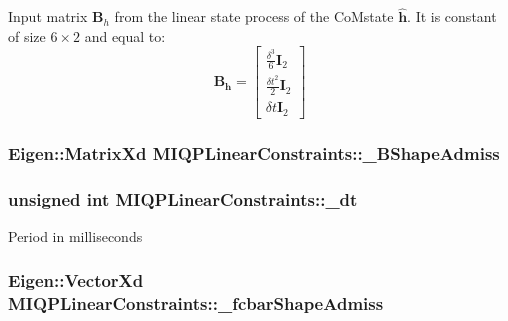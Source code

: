 \-Input matrix $\mathbf{B}_h$ from the linear state process of the \-Co\-Mstate $\hat{\mathbf{h}}$. \-It is constant of size $6\times2$ and equal to\-: \[ \mathbf{B_h} = \left[ \begin{array}{c} \frac{\delta^3}{6}\mathbf{I}_2 \\ \frac{\delta t^2}{2} \mathbf{I}_2 \\ \delta t \mathbf{I}_2 \end{array} \right] \] \hypertarget{classMIQPLinearConstraints_ab3ea8be40c22fa7d8035c7b5c5c1010c}{
\subsubsection[{\-\_\-\-B\-Shape\-Admiss}]{\setlength{\rightskip}{0pt plus 5cm}\-Eigen\-::\-Matrix\-Xd {\bf \-M\-I\-Q\-P\-Linear\-Constraints\-::\-\_\-\-B\-Shape\-Admiss}}}\label{classMIQPLinearConstraints_ab3ea8be40c22fa7d8035c7b5c5c1010c}
\hypertarget{classMIQPLinearConstraints_a403b0a1f684bda20236a759bd72950f2}{
\subsubsection[{\-\_\-dt}]{\setlength{\rightskip}{0pt plus 5cm}unsigned int {\bf \-M\-I\-Q\-P\-Linear\-Constraints\-::\-\_\-dt}}}\label{classMIQPLinearConstraints_a403b0a1f684bda20236a759bd72950f2}
\-Period in milliseconds \hypertarget{classMIQPLinearConstraints_a4e1cac634590c04e81d9b9341088efeb}{
\subsubsection[{\-\_\-fcbar\-Shape\-Admiss}]{\setlength{\rightskip}{0pt plus 5cm}\-Eigen\-::\-Vector\-Xd {\bf \-M\-I\-Q\-P\-Linear\-Constraints\-::\-\_\-fcbar\-Shape\-Admiss}}}\label{classMIQPLinearConstraints_a4e1cac634590c04e81d9b9341088efeb}
